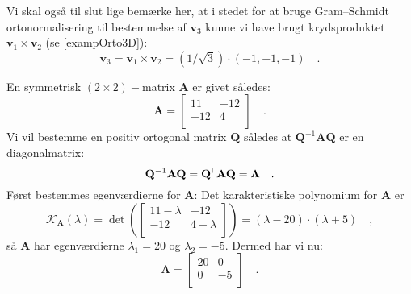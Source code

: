 \begin{example}
Vi skal også til slut lige bemærke her, at i stedet for at bruge Gram--Schmidt ortonormalisering  til bestemmelse af $\mathbf{v}_{3}$ kunne vi have brugt krydsproduktet $\mathbf{v}_{1} \times \mathbf{v}_{2}$ (se \ref{exampOrto3D}):
\begin{equation}
\mathbf{v}_{3} = \mathbf{v}_{1} \times \mathbf{v}_{2} = (1/\sqrt{3})\cdot (-1, -1, -1) \quad .
\end{equation}
\end{example}


\begin{example}\label{exampLAbog8.21}
En symmetrisk $(2 \times 2)-$matrix $\mathbf{A}$ er givet således:
\begin{equation}
\mathbf{A} = \left[
               \begin{array}{rr}
                 11 & -12 \\
                 -12 & 4 \\
               \end{array}
             \right]  \quad .
\end{equation}
Vi vil bestemme en positiv ortogonal matrix $\mathbf{Q}$ således at $\mathbf{Q}^{-1}\mathbf{A}\mathbf{Q}$ er en diagonalmatrix:
\begin{equation}
\mathbf{Q}^{-1}\mathbf{A}\mathbf{Q} = \mathbf{Q}\hspace*{-.6mm}^{\top}\mathbf{A}\mathbf{Q} =  \bm{\Lambda} \quad .
\end{equation}
Først bestemmes egenværdierne for $\mathbf{A}$: Det karakteristiske polynomium for $\mathbf{A}$ er
\begin{equation}
\mathcal{K}_{\mathbf{A}}(\lambda) = \det\left( \left[
                                                 \begin{array}{cc}
                                                   11-\lambda & -12 \\
                                                   -12 & 4-\lambda \\
                                                 \end{array}
                                               \right]
\right)  = (\lambda-20)\cdot(\lambda+5) \quad ,
\end{equation}
så $\mathbf{A}$ har egenværdierne $\lambda_{1} = 20$ og $\lambda_{2} = -5$. Dermed har vi nu:
\begin{equation}
\bm{\Lambda} = \left[
                 \begin{array}{cc}
                   20 &  0 \\
                   0 & -5 \\
                 \end{array}
               \right] \quad .
\end{equation}


\end{example}
